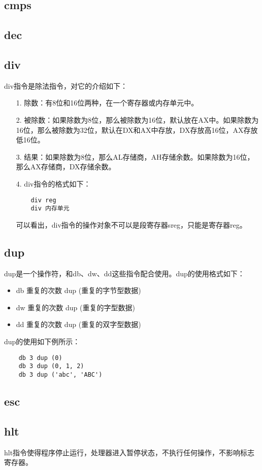 \documentclass[a4paper,left=2.5cm,right=2.5cm,11pt]{article}
\begin{document}
\subsection{cmps}
\subsection{dec}
\subsection{div}
	div指令是除法指令，对它的介绍如下：
	\begin{itemize}
		\item[1.] 除数：有8位和16位两种，在一个寄存器或内存单元中。
		\item[2.] 被除数：如果除数为8位，那么被除数为16位，默认放在AX中。如果除数为16位，那么被除数为32位，默认在DX和AX中存放，DX存放高16位，AX存放低16位。
		\item[3.] 结果：如果除数为8位，那么AL存储商，AH存储余数。如果除数为16位，那么AX存储商，DX存储余数。
		\item[4.] div指令的格式如下：
		\begin{lstlisting}
	div reg
	div 内存单元
		\end{lstlisting}

		可以看出，div指令的操作对象不可以是段寄存器sreg，只能是寄存器reg。
	\end{itemize}

\subsection{dup}
	dup是一个操作符，和db、dw、dd这些指令配合使用。dup的使用格式如下：
	\begin{itemize}
		\item db 重复的次数 dup (重复的字节型数据)
		\item dw 重复的次数 dup (重复的字型数据)
		\item dd 重复的次数 dup (重复的双字型数据)
	\end{itemize}

	dup的使用如下例所示：
	\begin{lstlisting}
	db 3 dup (0)
	db 3 dup (0, 1, 2)
	db 3 dup ('abc', 'ABC')
	\end{lstlisting}

\subsection{esc}
\subsection{hlt}
	hlt指令使得程序停止运行，处理器进入暂停状态，不执行任何操作，不影响标志寄存器。\par
\end{document}
